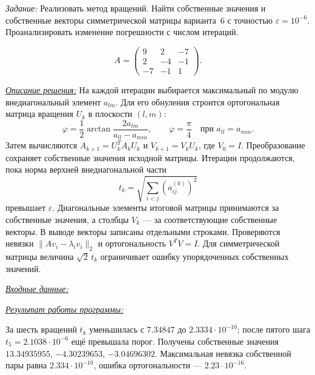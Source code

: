 \documentclass[a4paper,12pt]{article}
\newcommand{\labheading}[1]{\clearpage\noindent\hspace*{\parindent}{\fontsize{16}{19}\selectfont\bfseries Лабораторная работа № #1}\par\vspace{11pt}}
\newcommand{\task}[1]{\indent\textit{Задание:} #1\par}
\newcommand{\solution}[1]{\par\vspace{9pt}\indent\underline{\textit{Описание решения:}} #1}
\newcommand{\blocktitle}[1]{\par\Needspace{4\baselineskip}\vspace{9pt}\indent\underline{\textit{#1}}\par\vspace{4pt}}
\begin{document}
\labheading{1.4}
\task{Реализовать метод вращений. Найти собственные значения и
собственные векторы симметрической матрицы варианта~6 с точностью
$\varepsilon=10^{-6}$. Проанализировать изменение погрешности
с числом итераций.}
\[
A=\begin{pmatrix}9&2&-7\\2&-4&-1\\-7&-1&1\end{pmatrix}.
\]
\solution{}
На каждой итерации выбирается максимальный по модулю
внедиагональный элемент $a_{lm}$. Для его обнуления строится
ортогональная матрица вращения $U_k$ в плоскости $(l,m)$:
\[
\varphi=\frac12\arctan\frac{2a_{lm}}{a_{ll}-a_{mm}},
\qquad \varphi=\frac\pi4\quad\text{при }a_{ll}=a_{mm}.
\]
Затем вычисляются $A_{k+1}=U_k^TA_kU_k$ и
$V_{k+1}=V_kU_k$, где $V_0=I$. Преобразование сохраняет
собственные значения исходной матрицы. Итерации продолжаются,
пока норма верхней внедиагональной части
\[
t_k=\sqrt{\sum_{i<j}(a_{ij}^{(k)})^2}
\]
превышает $\varepsilon$. Диагональные элементы итоговой матрицы
принимаются за собственные значения, а столбцы $V_k$ --- за
соответствующие собственные векторы. В выводе векторы записаны
отдельными строками. Проверяются невязки
$\|Av_i-\lambda_iv_i\|_2$ и ортогональность $V^TV=I$.
Для симметрической матрицы величина $\sqrt2\,t_k$ ограничивает
ошибку упорядоченных собственных значений.
\blocktitle{Входные данные:}
\blocktitle{Результат работы программы:}
За шесть вращений $t_k$ уменьшилась с $7.34847$ до
$2.3334\cdot10^{-10}$; после пятого шага
$t_5=2.1038\cdot10^{-6}$ ещё превышала порог.
Получены собственные значения $13.34935955$, $-4.30239653$,
$-3.04696302$. Максимальная невязка собственной пары равна
$2.334\cdot10^{-10}$, ошибка ортогональности --- $2.23\cdot10^{-16}$.
\end{document}
